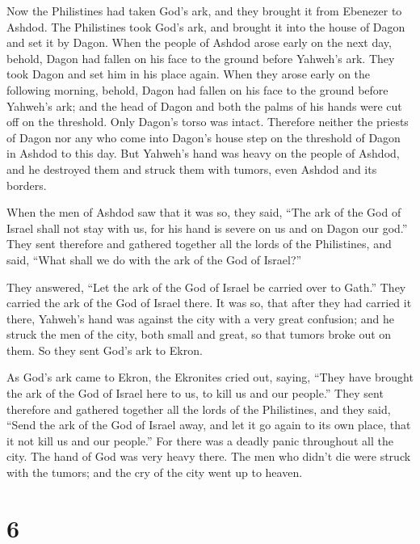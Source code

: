  Now the Philistines had taken God's ark, and they brought
it from Ebenezer to Ashdod.  The Philistines took God's
ark, and brought it into the house of Dagon and set it by Dagon.
 When the people of Ashdod arose early on the next day,
behold, Dagon had fallen on his face to the ground before Yahweh's ark.
They took Dagon and set him in his place again.  When they
arose early on the following morning, behold, Dagon had fallen on his
face to the ground before Yahweh's ark; and the head of Dagon and both
the palms of his hands were cut off on the threshold. Only Dagon's torso
was intact.  Therefore neither the priests of Dagon nor
any who come into Dagon's house step on the threshold of Dagon in Ashdod
to this day.  But Yahweh's hand was heavy on the people of
Ashdod, and he destroyed them and struck them with tumors, even Ashdod
and its borders.

 When the men of Ashdod saw that it was so, they said,
``The ark of the God of Israel shall not stay with us, for his hand is
severe on us and on Dagon our god.''  They sent therefore
and gathered together all the lords of the Philistines, and said, ``What
shall we do with the ark of the God of Israel?''

They answered, ``Let the ark of the God of Israel be carried over to
Gath.'' They carried the ark of the God of Israel there. 
It was so, that after they had carried it there, Yahweh's hand was
against the city with a very great confusion; and he struck the men of
the city, both small and great, so that tumors broke out on them.
 So they sent God's ark to Ekron.

As God's ark came to Ekron, the Ekronites cried out, saying, ``They have
brought the ark of the God of Israel here to us, to kill us and our
people.''  They sent therefore and gathered together all
the lords of the Philistines, and they said, ``Send the ark of the God
of Israel away, and let it go again to its own place, that it not kill
us and our people.'' For there was a deadly panic throughout all the
city. The hand of God was very heavy there.  The men who
didn't die were struck with the tumors; and the cry of the city went up
to heaven.

\hypertarget{section-5}{%
\section{6}\label{section-5}}


